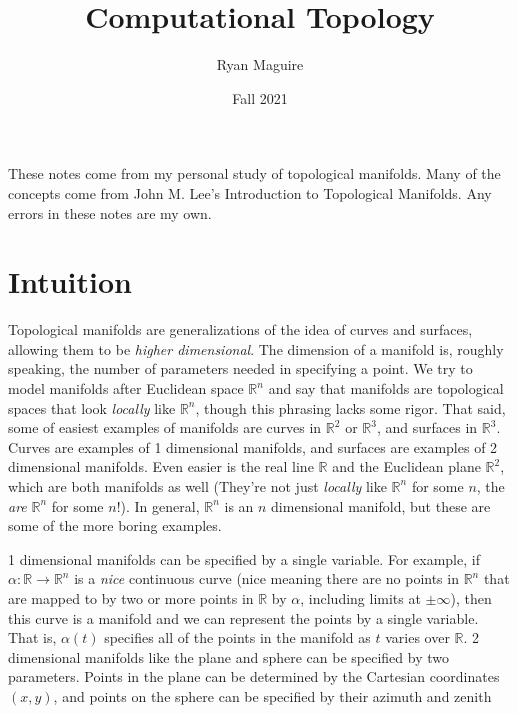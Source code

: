 \documentclass{article}
\title{Computational Topology}
\author{Ryan Maguire}
\date{Fall 2021}
\theoremstyle{plain}
\theoremstyle{normal}
\begin{document}
    \maketitle
    These notes come from my personal study of topological manifolds. Many of
    the concepts come from John M. Lee's Introduction to Topological
    Manifolds. Any errors in these notes are my own.
    \tableofcontents
    \section{Intuition}
        Topological manifolds are generalizations of the idea of curves and
        surfaces, allowing them to be \textit{higher dimensional}. The
        dimension of a manifold is, roughly speaking, the number of parameters
        needed in specifying a point. We try to model manifolds after Euclidean
        space $\mathbb{R}^{n}$ and say that manifolds are topological spaces
        that look \textit{locally} like $\mathbb{R}^{n}$, though this phrasing
        lacks some rigor. That said, some of easiest examples of manifolds are
        curves in $\mathbb{R}^{2}$ or $\mathbb{R}^{3}$, and surfaces in
        $\mathbb{R}^{3}$. Curves are examples of 1 dimensional manifolds, and
        surfaces are examples of 2 dimensional manifolds. Even easier is the
        real line $\mathbb{R}$ and the Euclidean plane $\mathbb{R}^{2}$, which
        are both manifolds as well (They're not just \textit{locally} like
        $\mathbb{R}^{n}$ for some $n$, the \textit{are}
        $\mathbb{R}^{n}$ for some $n$!). In general,
        $\mathbb{R}^{n}$ is an $n$ dimensional manifold, but these are some of
        the more boring examples.
        \par\hfill\par
        1 dimensional manifolds can be specified by a single variable. For
        example, if $\alpha:\mathbb{R}\rightarrow\mathbb{R}^{n}$ is a
        \textit{nice} continuous curve (nice meaning there are no points in
        $\mathbb{R}^{n}$ that are mapped to by two or more points in
        $\mathbb{R}$ by $\alpha$, including limits at $\pm\infty$), then this
        curve is a manifold and we can represent the points by a single
        variable. That is, $\alpha(t)$ specifies all of the points in the
        manifold as $t$ varies over $\mathbb{R}$. 2 dimensional manifolds like
        the plane and sphere can be specified by two parameters. Points in the
        plane can be determined by the Cartesian coordinates $(x,y)$, and
        points on the sphere can be specified by their azimuth and zenith
\end{document}
